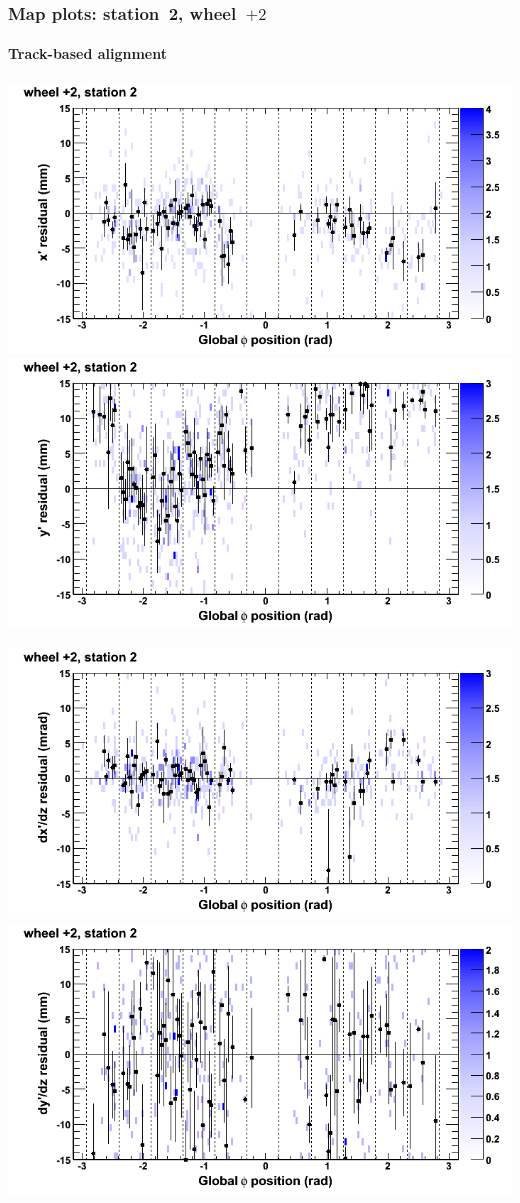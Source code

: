 \documentclass[compress]{beamer}
\begin{document}
\begin{frame}
\frametitle{Map plots: station~2, wheel~$+2$}
\framesubtitle{Track-based alignment}
\includegraphics[width=0.5\linewidth]{mapplots_re05/DTvsphi_st2whE_x.png}
\includegraphics[width=0.5\linewidth]{mapplots_re05/DTvsphi_st2whE_y.png}

\includegraphics[width=0.5\linewidth]{mapplots_re05/DTvsphi_st2whE_dxdz.png}
\includegraphics[width=0.5\linewidth]{mapplots_re05/DTvsphi_st2whE_dydz.png}
\end{frame}
\end{document}
